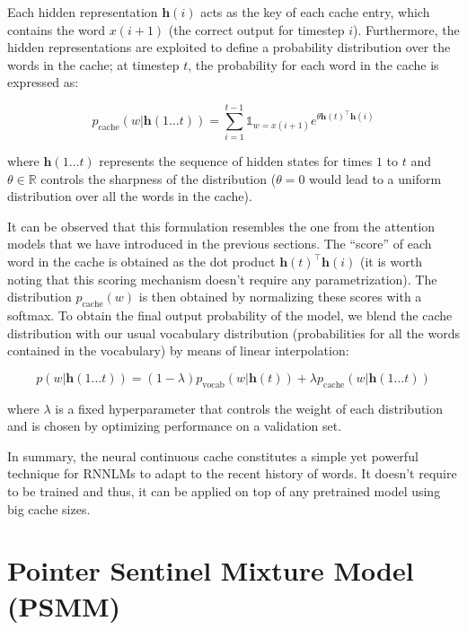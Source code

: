 Each hidden representation $\mathbf{h}(i)$ acts as the key of each cache entry, which contains the word $x(i+1)$ (the correct output for timestep $i$). Furthermore, the hidden representations are exploited to define a probability distribution over the words in the cache; at timestep $t$, the probability for each word in the cache is expressed as:

\begin{equation} \label{eq:cacheProb}
	p_{\text{cache}}(w|\mathbf{h}(1\ldots t)) = \sum_{i=1}^{t-1} \mathbb{1}_{w=x(i+1)} e^{\theta\mathbf{h}(t)^{\top}\mathbf{h}(i)}
\end{equation}

where $\mathbf{h}(1\ldots t)$ represents the sequence of hidden states for times $1$ to $t$ and $\theta \in \mathbb{R}$ controls the sharpness of the distribution ($\theta=0$ would lead to a uniform distribution over all the words in the cache).

It can be observed that this formulation resembles the one from the attention models that we have introduced in the previous sections. The ``score'' of each word in the cache is obtained as the dot product $\mathbf{h}(t)^{\top}\mathbf{h}(i)$ (it is worth noting that this scoring mechanism doesn't require any parametrization). The distribution $p_{\text{cache}}(w)$ is then obtained by normalizing these scores with a softmax. To obtain the final output probability of the model, we blend the cache distribution with our usual vocabulary distribution (probabilities for all the words contained in the vocabulary) by means of linear interpolation:

\begin{equation} \label{eq:contCache}
	p(w|\mathbf{h}(1\ldots t)) = (1-\lambda)p_{\text{vocab}}(w|\mathbf{h}(t)) + \lambda p_{\text{cache}}(w|\mathbf{h}(1\ldots t))
\end{equation}

where $\lambda$ is a fixed hyperparameter that controls the weight of each distribution and is chosen by optimizing performance on a validation set. 

In summary, the neural continuous cache constitutes a simple yet powerful technique for RNNLMs to adapt to the recent history of words. It doesn't require to be trained and thus, it can be applied on top of any pretrained model using big cache sizes.

\section{Pointer Sentinel Mixture Model (PSMM)}
\label{sec:pointerMixture}

